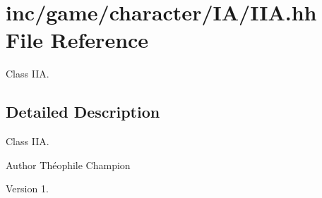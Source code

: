 \hypertarget{IIA_8hh}{}\section{inc/game/character/\+I\+A/\+I\+IA.hh File Reference}
\label{IIA_8hh}


Class I\+IA.  




\subsection{Detailed Description}
Class I\+IA. 

\begin{DoxyAuthor}{Author}
Théophile Champion 
\end{DoxyAuthor}
\begin{DoxyVersion}{Version}
1. 
\end{DoxyVersion}
